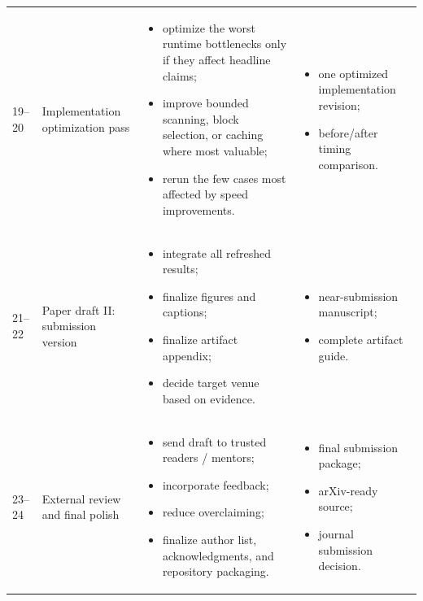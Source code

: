 \documentclass[11pt]{article}
\begin{document}
\begin{longtable}{p{} p{} p{} p{}}
19--20 &
Implementation optimization pass &
\begin{itemize}
    \item optimize the worst runtime bottlenecks only if they affect headline claims;
    \item improve bounded scanning, block selection, or caching where most valuable;
    \item rerun the few cases most affected by speed improvements.
\end{itemize}
&
\begin{itemize}
    \item one optimized implementation revision;
    \item before/after timing comparison.
\end{itemize}
\\

21--22 &
Paper draft II: submission version &
\begin{itemize}
    \item integrate all refreshed results;
    \item finalize figures and captions;
    \item finalize artifact appendix;
    \item decide target venue based on evidence.
\end{itemize}
&
\begin{itemize}
    \item near-submission manuscript;
    \item complete artifact guide.
\end{itemize}
\\

23--24 &
External review and final polish &
\begin{itemize}
    \item send draft to trusted readers / mentors;
    \item incorporate feedback;
    \item reduce overclaiming;
    \item finalize author list, acknowledgments, and repository packaging.
\end{itemize}
&
\begin{itemize}
    \item final submission package;
    \item arXiv-ready source;
    \item journal submission decision.
\end{itemize}
\\

\bottomrule
\end{longtable}
\end{document}
